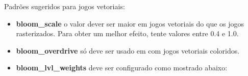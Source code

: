 \documentclass[letterpaper,10pt,brazil]{sphinxmanual}
\begin{document}
Padrões sugeridos para jogos vetoriais:
\begin{itemize}
\item {} 
\textbf{bloom\_scale} o valor dever ser maior em jogos vetoriais do que os
jogos rasterizados. Para obter um melhor efeito, tente valores entre
0.4 e 1.0.

\item {} 
\textbf{bloom\_overdrive} só deve ser usado em com jogos vetoriais
coloridos.

\item {} 
\textbf{bloom\_lvl\_weights} deve ser configurado como mostrado abaixo:

\end{itemize}

\noindent\begin{tabular}{|p{0.317\linewidth}|p{0.317\linewidth}|p{0.317\linewidth}|}
\hline


\end{tabular}
\end{document}
